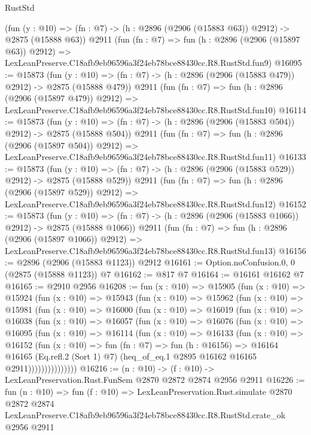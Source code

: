 \begin{lexlean}{RustStd}
\begin{coremodule}
    (fun (y : @10) => (fn : @7) -> (h : @2896 (@2906 (@15883 @63)) @2912) -> @2875 (@15888 @63))
    @2911
    (fun (fn : @7) =>
    fun (h : @2896 (@2906 (@15897 @63)) @2912) =>
    LexLeanPreserve.C18afb9eb96596a3f24eb78bce88430cc.R8.RustStd.fun9)
@16095 := @15873
    (fun (y : @10) => (fn : @7) -> (h : @2896 (@2906 (@15883 @479)) @2912) -> @2875 (@15888 @479))
    @2911
    (fun (fn : @7) =>
    fun (h : @2896 (@2906 (@15897 @479)) @2912) =>
    LexLeanPreserve.C18afb9eb96596a3f24eb78bce88430cc.R8.RustStd.fun10)
@16114 := @15873
    (fun (y : @10) => (fn : @7) -> (h : @2896 (@2906 (@15883 @504)) @2912) -> @2875 (@15888 @504))
    @2911
    (fun (fn : @7) =>
    fun (h : @2896 (@2906 (@15897 @504)) @2912) =>
    LexLeanPreserve.C18afb9eb96596a3f24eb78bce88430cc.R8.RustStd.fun11)
@16133 := @15873
    (fun (y : @10) => (fn : @7) -> (h : @2896 (@2906 (@15883 @529)) @2912) -> @2875 (@15888 @529))
    @2911
    (fun (fn : @7) =>
    fun (h : @2896 (@2906 (@15897 @529)) @2912) =>
    LexLeanPreserve.C18afb9eb96596a3f24eb78bce88430cc.R8.RustStd.fun12)
@16152 := @15873
    (fun (y : @10) => (fn : @7) -> (h : @2896 (@2906 (@15883 @1066)) @2912) -> @2875 (@15888 @1066))
    @2911
    (fun (fn : @7) =>
    fun (h : @2896 (@2906 (@15897 @1066)) @2912) =>
    LexLeanPreserve.C18afb9eb96596a3f24eb78bce88430cc.R8.RustStd.fun13)
@16156 := @2896 (@2906 (@15883 @1123)) @2912
@16161 := Option.noConfusion.{0, 0} (@2875 (@15888 @1123)) @7
@16162 := @817 @7
@16164 := @16161 @16162 @7
@16165 := @2910 @2956
@16208 := fun (x : @10) =>
  @15905
    (fun (x : @10) =>
    @15924
      (fun (x : @10) =>
      @15943
        (fun (x : @10) =>
        @15962
          (fun (x : @10) =>
          @15981
            (fun (x : @10) =>
            @16000
              (fun (x : @10) =>
              @16019
                (fun (x : @10) =>
                @16038
                  (fun (x : @10) =>
                  @16057
                    (fun (x : @10) =>
                    @16076
                      (fun (x : @10) =>
                      @16095
                        (fun (x : @10) =>
                        @16114
                          (fun (x : @10) =>
                          @16133
                            (fun (x : @10) =>
                            @16152
                              (fun (x : @10) =>
                              fun (fn : @7) =>
                              fun (h : @16156) =>
                              @16164
                                @16165
                                (Eq.refl.{2} (Sort 1) @7)
                                (heq_of_eq.{1} @2895 @16162 @16165 @2911)))))))))))))))
@16216 := (n : @10) -> (f : @10) -> LexLeanPreservation.Rust.FunSem @2870 @2872 @2874 @2956 @2911
@16226 := fun (n : @10) =>
  fun (f : @10) =>
  LexLeanPreservation.Rust.simulate
    @2870
    @2872
    @2874
    LexLeanPreserve.C18afb9eb96596a3f24eb78bce88430cc.R8.RustStd.crate_ok
    @2956
    @2911
\end{coremodule}
\end{lexlean}
